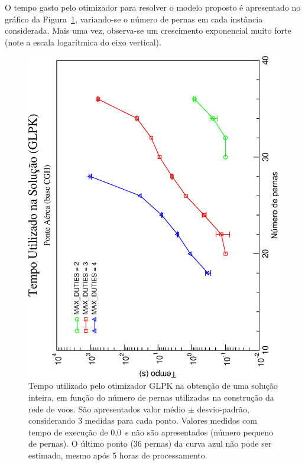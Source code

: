 \documentclass[12pt,a4paper]{article}
\begin{document}
O tempo gasto pelo otimizador para resolver o modelo proposto é apresentado no gráfico da 
Figura~\ref{fig:solution}, variando-se o número de pernas em cada instância considerada. 
Mais uma vez, observa-se um crescimento exponencial muito forte (note a escala logarítmica do eixo 
vertical).

\begin{figure}[htb]
	\begin{center}
		\includegraphics[scale=0.45,angle=-90]{fig/glpk_solution_time.eps}
		\caption{Tempo utilizado pelo otimizador GLPK na obtenção de uma solução inteira, em função do 
		número de pernas utilizadas na construção da rede de voos. São apresentados valor médio $\pm$ 
		desvio-padrão, considerando 3 medidas para cada ponto. Valores medidos com tempo de execução 
		de 0,0~s não são apresentados (número pequeno de pernas). O último ponto (36 pernas) da curva 
		azul não pode ser estimado, mesmo após 5 horas de processamento.}
		\label{fig:solution}
	\end{center}
\end{figure}
\end{document}
